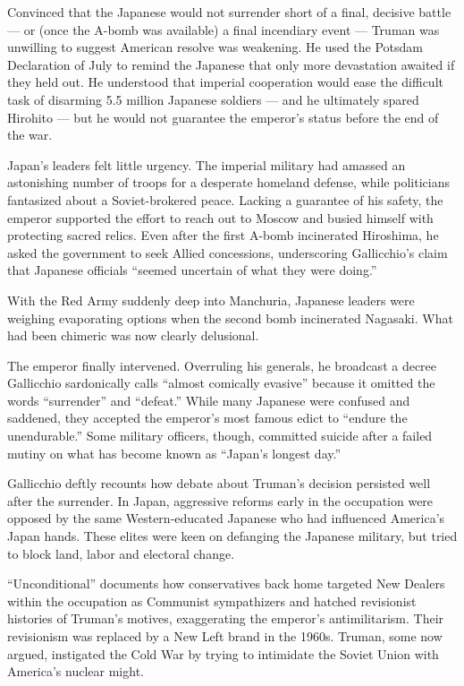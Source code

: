 Convinced that the Japanese would not surrender short of a final,
decisive battle --- or (once the A-bomb was available) a final
incendiary event --- Truman was unwilling to suggest American resolve
was weakening. He used the Potsdam Declaration of July to remind the
Japanese that only more devastation awaited if they held out. He
understood that imperial cooperation would ease the difficult task of
disarming 5.5 million Japanese soldiers --- and he ultimately spared
Hirohito --- but he would not guarantee the emperor's status before the
end of the war.

Japan's leaders felt little urgency. The imperial military had amassed
an astonishing number of troops for a desperate homeland defense, while
politicians fantasized about a Soviet-brokered peace. Lacking a
guarantee of his safety, the emperor supported the effort to reach out
to Moscow and busied himself with protecting sacred relics. Even after
the first A-bomb incinerated Hiroshima, he asked the government to seek
Allied concessions, underscoring Gallicchio's claim that Japanese
officials ``seemed uncertain of what they were doing.''

With the Red Army suddenly deep into Manchuria, Japanese leaders were
weighing evaporating options when the second bomb incinerated Nagasaki.
What had been chimeric was now clearly delusional.

The emperor finally intervened. Overruling his generals, he broadcast a
decree Gallicchio sardonically calls ``almost comically evasive''
because it omitted the words ``surrender'' and ``defeat.'' While many
Japanese were confused and saddened, they accepted the emperor's most
famous edict to ``endure the unendurable.'' Some military officers,
though, committed suicide after a failed mutiny on what has become known
as ``Japan's longest day.''

Gallicchio deftly recounts how debate about Truman's decision persisted
well after the surrender. In Japan, aggressive reforms early in the
occupation were opposed by the same Western-educated Japanese who had
influenced America's Japan hands. These elites were keen on defanging
the Japanese military, but tried to block land, labor and electoral
change.

``Unconditional'' documents how conservatives back home targeted New
Dealers within the occupation as Communist sympathizers and hatched
revisionist histories of Truman's motives, exaggerating the emperor's
antimilitarism. Their revisionism was replaced by a New Left brand in
the 1960s. Truman, some now argued, instigated the Cold War by trying to
intimidate the Soviet Union with America's nuclear might.

